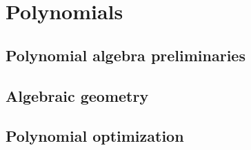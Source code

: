 \chapter{Polynomials}

\section{Polynomial algebra preliminaries}

\section{Algebraic geometry}

\section{Polynomial optimization}
